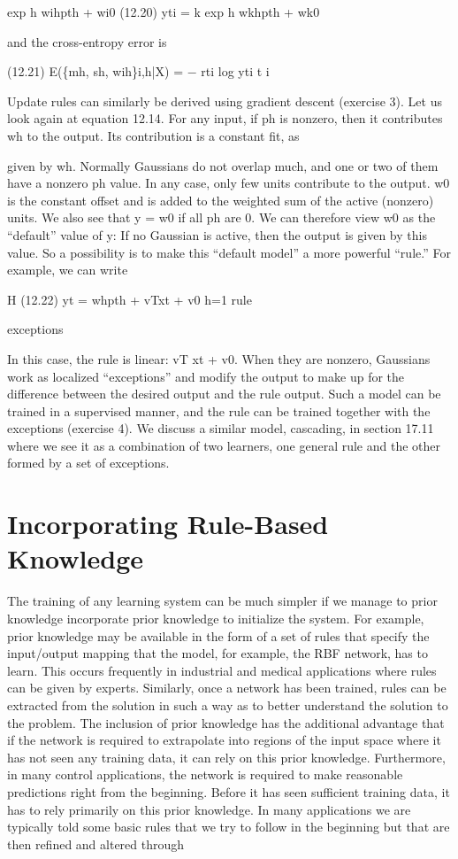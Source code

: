 exp h wihpth + wi0 (12.20) yti = k exp h wkhpth + wk0

and the cross-entropy error is

(12.21) E(\{mh, sh, wih\}i,h|X) = $-$ rti log yti t i

Update rules can similarly be derived using gradient descent (exercise 3). Let us look again at equation 12.14. For any input, if ph is nonzero, then it contributes wh to the output. Its contribution is a constant fit, as

given by wh. Normally Gaussians do not overlap much, and one or two of them have a nonzero ph value. In any case, only few units contribute to the output. w0 is the constant offset and is added to the weighted sum of the active (nonzero) units. We also see that y = w0 if all ph are 0. We can therefore view w0 as the “default” value of y: If no Gaussian is active, then the output is given by this value. So a possibility is to make this “default model” a more powerful “rule.” For example, we can write

H (12.22) yt = whpth + vTxt + v0 h=1 rule

exceptions

In this case, the rule is linear: vT xt + v0. When they are nonzero, Gaussians work as localized “exceptions” and modify the output to make up for the difference between the desired output and the rule output. Such a model can be trained in a supervised manner, and the rule can be trained together with the exceptions (exercise 4). We discuss a similar model, cascading, in section 17.11 where we see it as a combination of two learners, one general rule and the other formed by a set of exceptions.

\section{Incorporating Rule-Based Knowledge}

The training of any learning system can be much simpler if we manage to prior knowledge incorporate prior knowledge to initialize the system. For example, prior knowledge may be available in the form of a set of rules that specify the input/output mapping that the model, for example, the RBF network, has to learn. This occurs frequently in industrial and medical applications where rules can be given by experts. Similarly, once a network has been trained, rules can be extracted from the solution in such a way as to better understand the solution to the problem. The inclusion of prior knowledge has the additional advantage that if the network is required to extrapolate into regions of the input space where it has not seen any training data, it can rely on this prior knowledge. Furthermore, in many control applications, the network is required to make reasonable predictions right from the beginning. Before it has seen sufficient training data, it has to rely primarily on this prior knowledge. In many applications we are typically told some basic rules that we try to follow in the beginning but that are then refined and altered through

